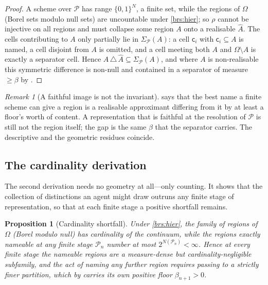 \documentclass[11pt,twocolumn,a4paper]{article}
\theoremstyle{thmstyle}
\newtheorem{proposition}[theorem]{Proposition}
\theoremstyle{definition}
\theoremstyle{remark}
\newtheorem{remark}[theorem]{Remark}
\newcommand{\Space}{\Omega}
\newcommand{\thick}{\beta}
\newcommand{\Part}{\mathscr{P}}
\newcommand{\cell}{\mathsf{c}}
\begin{document}
\begin{proof}
A scheme over $\Part$ has range $\{0,1\}^N$, a finite set, while the regions of
$\Space$ (Borel sets modulo null sets) are uncountable under \ref{brs:hier}; so
$\rho$ cannot be injective on all regions and must collapse some region $A$ onto
a realisable $\widehat A$. The cells contributing to $A$ only partially lie in
$\Sigma_\Part(A)$: a cell $\cell_i$ with $\cell_i\subseteq A$ is named, a cell
disjoint from $A$ is omitted, and a cell meeting both $A$ and $\Space\setminus A$
is exactly a separator cell. Hence $A\,\triangle\,\widehat A\subseteq
\Sigma_\Part(A)$, and where $A$ is non-realisable this symmetric difference is
non-null and contained in a separator of measure $\ge\thick$ by
.
\end{proof}

\begin{remark}[A faithful image is not the invariant]
\label{rem:faithful}
 says that the best name a finite scheme can give a region
is a realisable approximant differing from it by at least a floor's worth of
content. A representation that is faithful at the resolution of $\Part$ is still
not the region itself; the gap is the same $\thick$ that the separator carries.
The descriptive and the geometric residues coincide.
\end{remark}

\subsection{The cardinality derivation}

The second derivation needs no geometry at all---only counting. It shows that the
collection of distinctions an agent might draw outruns any finite stage of
representation, so that at each finite stage a positive shortfall remains.

\begin{proposition}[Cardinality shortfall]
\label{prop:card}
Under \ref{brs:hier}, the family of regions of $\Space$ \textup{(}Borel modulo
null\textup{)} has cardinality of the continuum, while the regions exactly
nameable at any finite stage $\Part_n$ number at most $2^{N(\Part_n)}<\infty$.
Hence at every finite stage the nameable regions are a measure-dense but
cardinality-negligible subfamily, and the act of naming any further region
requires passing to a strictly finer partition, which by 
carries its own positive floor $\thick_{n+1}>0$.
\end{proposition}
\end{document}
